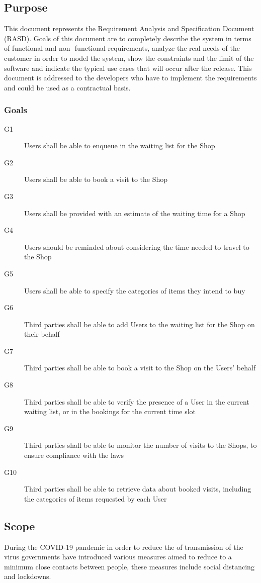 \subsection{Purpose}
{ \color{green} %
This document represents the Requirement Analysis and Specification Document (RASD).
Goals of this document are to completely describe the system in terms of functional and non-
functional requirements, analyze the real needs of the customer in order to model the system,
show the constraints and the limit of the software and indicate the typical use cases that will
occur after the release. This document is addressed to the developers who have to implement
the requirements and could be used as a contractual basis.
}
\subsubsection{Goals}

\begin{description}
    \item [G1]  Users shall be able to enqueue in the waiting list for the Shop
    \item [G2]  Users shall be able to book a visit to the Shop
    \item [G3]  Users shall be provided with an estimate of the waiting time for a Shop
    \item [G4]  Users should be reminded about considering the time needed to travel to the Shop
    \item [G5]  Users shall be able to specify the categories of items they intend to buy 
    
    \item [G6]  Third parties shall be able to add Users to the waiting list for the Shop on their behalf
    \item [G7]  Third parties shall be able to book a visit to the Shop on the Users' behalf
    \item [G8]  Third parties shall be able to verify the presence of a User in the current waiting list, or in the bookings for the current time slot
    \item [G9]  Third parties shall be able to monitor the number of visits to the Shops, to ensure compliance with the laws
    \item [G10] Third parties shall be able to retrieve data about booked visits, including the categories of items requested by each User 
    
\end{description}
\subsection{Scope}
During the COVID-19 pandemic in order to reduce the of transmission of the virus governments have introduced various measures aimed to reduce to a minimum close contacts between people, these measures include social distancing and lockdowns.

